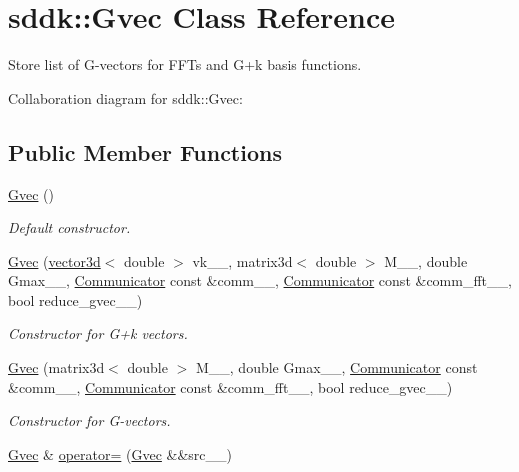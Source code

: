 \hypertarget{classsddk_1_1_gvec}{}\section{sddk\+:\+:Gvec Class Reference}
\label{classsddk_1_1_gvec}


Store list of G-\/vectors for F\+F\+Ts and G+k basis functions.  




Collaboration diagram for sddk\+:\+:Gvec\+:
\subsection*{Public Member Functions}
\begin{DoxyCompactItemize}
\item 
\hyperlink{classsddk_1_1_gvec_ade8f1a8a554e5cbbb73bb4cfcd9c49cf}{Gvec} ()
\begin{DoxyCompactList}\small\item\em Default constructor. \end{DoxyCompactList}\item 
\hyperlink{classsddk_1_1_gvec_a34d640a5f7fb7d5ca0e5e18de94b32c1}{Gvec} (\hyperlink{classgeometry3d_1_1vector3d}{vector3d}$<$ double $>$ vk\+\_\+\+\_\+, matrix3d$<$ double $>$ M\+\_\+\+\_\+, double Gmax\+\_\+\+\_\+, \hyperlink{classsddk_1_1_communicator}{Communicator} const \&comm\+\_\+\+\_\+, \hyperlink{classsddk_1_1_communicator}{Communicator} const \&comm\+\_\+fft\+\_\+\+\_\+, bool reduce\+\_\+gvec\+\_\+\+\_\+)
\begin{DoxyCompactList}\small\item\em Constructor for G+k vectors. \end{DoxyCompactList}\item 
\hyperlink{classsddk_1_1_gvec_a072408f26c727e83db69c3a56e1a2627}{Gvec} (matrix3d$<$ double $>$ M\+\_\+\+\_\+, double Gmax\+\_\+\+\_\+, \hyperlink{classsddk_1_1_communicator}{Communicator} const \&comm\+\_\+\+\_\+, \hyperlink{classsddk_1_1_communicator}{Communicator} const \&comm\+\_\+fft\+\_\+\+\_\+, bool reduce\+\_\+gvec\+\_\+\+\_\+)
\begin{DoxyCompactList}\small\item\em Constructor for G-\/vectors. \end{DoxyCompactList}\item 
\hyperlink{classsddk_1_1_gvec}{Gvec} \& \hyperlink{classsddk_1_1_gvec_a507447501d2707d86c5316d8fbda5b26}{operator=} (\hyperlink{classsddk_1_1_gvec}{Gvec} \&\&src\+\_\+\+\_\+)

\end{DoxyCompactItemize}
